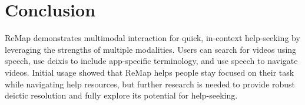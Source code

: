 \section{Conclusion}
ReMap demonstrates multimodal interaction for quick, in-context help-seeking by leveraging the strengths of multiple modalities. Users can search for videos using speech, use deixis to include app-specific terminology, and use speech to navigate videos. Initial usage showed that ReMap helps people stay focused on their task while navigating help resources, but further research is needed to provide robust deictic resolution and fully explore its potential for help-seeking.